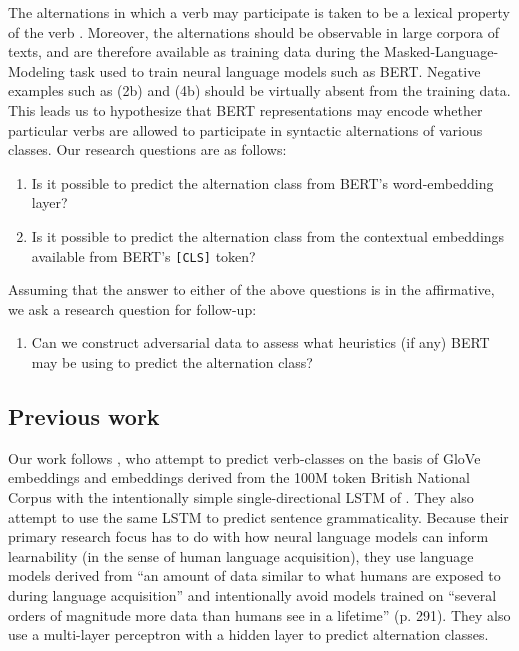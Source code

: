 \documentclass[11pt]{article}
\begin{document}
The alternations in which a verb may participate is taken to be a lexical property of the verb \citep[e.g.][]{pinker1989,levin1993,levin1995unaccusativity,shafer2009causative}.  Moreover, the alternations should be observable in large corpora of texts, and are therefore available as training data during the Masked-Language-Modeling task used to train neural language models such as BERT.  Negative examples such as (2b) and (4b) should be virtually absent from the training data.  This leads us to hypothesize that BERT representations may encode whether particular verbs are allowed to participate in syntactic alternations of various classes.  Our research questions are as follows:

\begin{enumerate}
    \item Is it possible to predict the alternation class from BERT's word-embedding layer?
    \item Is it possible to predict the alternation class from the contextual embeddings available from BERT's \texttt{[CLS]} token?
\end{enumerate}

Assuming that the answer to either of the above questions is in the affirmative, we ask a research question for follow-up:

\begin{enumerate}[resume]
    \item Can we construct adversarial data to assess what heuristics (if any) BERT may be using to predict the alternation class?
\end{enumerate}

\subsection{Previous work}
Our work follows \citet{kann2018verb}, who attempt to predict verb-classes on the basis of GloVe embeddings \citep{glove} and embeddings derived from the 100M token British National Corpus with the intentionally simple single-directional LSTM of \citealt{warstadt2019neural}.  They also attempt to use the same LSTM to predict sentence grammaticality.  Because their primary research focus has to do with how neural language models can inform learnability (in the sense of human language acquisition), they use language models derived from ``an amount of data similar to what humans are exposed to during language acquisition'' and intentionally avoid models trained on ``several orders of magnitude more data than humans see in a lifetime'' (p. 291).  They also use a multi-layer perceptron with a hidden layer to predict alternation classes.  
\end{document}
